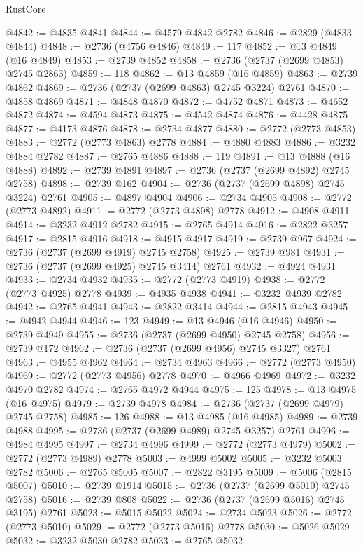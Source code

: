 \begin{lexlean}{RustCore}
\begin{coremodule}
@4842 := @4835 @4841
@4844 := @4579 @4842 @2782
@4846 := @2829 (@4833 @4844)
@4848 := @2736 (@4756 @4846)
@4849 := 117
@4852 := @13 @4849 (@16 @4849)
@4853 := @2739 @4852
@4858 := @2736 (@2737 (@2699 @4853) @2745 @2863)
@4859 := 118
@4862 := @13 @4859 (@16 @4859)
@4863 := @2739 @4862
@4869 := @2736 (@2737 (@2699 @4863) @2745 @3224) @2761
@4870 := @4858 @4869
@4871 := @4848 @4870
@4872 := @4752 @4871
@4873 := @4652 @4872
@4874 := @4594 @4873
@4875 := @4542 @4874
@4876 := @4428 @4875
@4877 := @4173 @4876
@4878 := @2734 @4877
@4880 := @2772 (@2773 @4853)
@4883 := @2772 (@2773 @4863) @2778
@4884 := @4880 @4883
@4886 := @3232 @4884 @2782
@4887 := @2765 @4886
@4888 := 119
@4891 := @13 @4888 (@16 @4888)
@4892 := @2739 @4891
@4897 := @2736 (@2737 (@2699 @4892) @2745 @2758)
@4898 := @2739 @162
@4904 := @2736 (@2737 (@2699 @4898) @2745 @3224) @2761
@4905 := @4897 @4904
@4906 := @2734 @4905
@4908 := @2772 (@2773 @4892)
@4911 := @2772 (@2773 @4898) @2778
@4912 := @4908 @4911
@4914 := @3232 @4912 @2782
@4915 := @2765 @4914
@4916 := @2822 @3257
@4917 := @2815 @4916
@4918 := @4915 @4917
@4919 := @2739 @967
@4924 := @2736 (@2737 (@2699 @4919) @2745 @2758)
@4925 := @2739 @981
@4931 := @2736 (@2737 (@2699 @4925) @2745 @3414) @2761
@4932 := @4924 @4931
@4933 := @2734 @4932
@4935 := @2772 (@2773 @4919)
@4938 := @2772 (@2773 @4925) @2778
@4939 := @4935 @4938
@4941 := @3232 @4939 @2782
@4942 := @2765 @4941
@4943 := @2822 @3414
@4944 := @2815 @4943
@4945 := @4942 @4944
@4946 := 123
@4949 := @13 @4946 (@16 @4946)
@4950 := @2739 @4949
@4955 := @2736 (@2737 (@2699 @4950) @2745 @2758)
@4956 := @2739 @172
@4962 := @2736 (@2737 (@2699 @4956) @2745 @3327) @2761
@4963 := @4955 @4962
@4964 := @2734 @4963
@4966 := @2772 (@2773 @4950)
@4969 := @2772 (@2773 @4956) @2778
@4970 := @4966 @4969
@4972 := @3232 @4970 @2782
@4974 := @2765 @4972 @4944
@4975 := 125
@4978 := @13 @4975 (@16 @4975)
@4979 := @2739 @4978
@4984 := @2736 (@2737 (@2699 @4979) @2745 @2758)
@4985 := 126
@4988 := @13 @4985 (@16 @4985)
@4989 := @2739 @4988
@4995 := @2736 (@2737 (@2699 @4989) @2745 @3257) @2761
@4996 := @4984 @4995
@4997 := @2734 @4996
@4999 := @2772 (@2773 @4979)
@5002 := @2772 (@2773 @4989) @2778
@5003 := @4999 @5002
@5005 := @3232 @5003 @2782
@5006 := @2765 @5005
@5007 := @2822 @3195
@5009 := @5006 (@2815 @5007)
@5010 := @2739 @1914
@5015 := @2736 (@2737 (@2699 @5010) @2745 @2758)
@5016 := @2739 @808
@5022 := @2736 (@2737 (@2699 @5016) @2745 @3195) @2761
@5023 := @5015 @5022
@5024 := @2734 @5023
@5026 := @2772 (@2773 @5010)
@5029 := @2772 (@2773 @5016) @2778
@5030 := @5026 @5029
@5032 := @3232 @5030 @2782
@5033 := @2765 @5032

\end{coremodule}
\end{lexlean}
